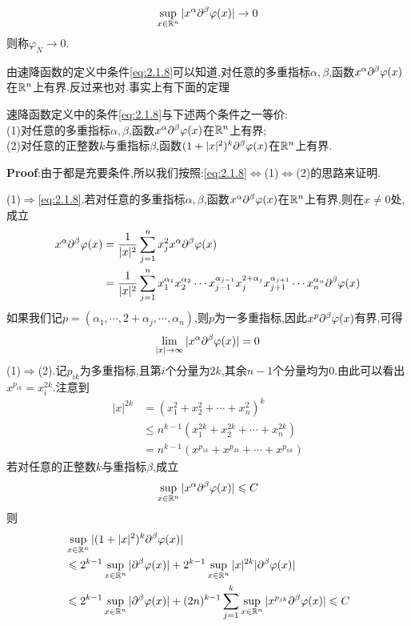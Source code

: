 $$
\sup_{x\in\mathbb{R} ^n}|x^{\alpha}\partial^{\beta}\varphi (x)|\to 0
$$
则称$\varphi_N\to 0$.\par
由速降函数的定义中条件\eqref{eq:2.1.8}可以知道,对任意的多重指标$\alpha,\beta$,函数$x^{\alpha}\partial^{\beta}\varphi (x)$在$\mathbb{R}^n$上有界.反过来也对.事实上有下面的定理
\begin{tcolorbox}[colback=KuangNei,colframe=BianKuang,title=\textbf{速降函数极限条件的等价定义},sharpish corners]
   速降函数定义中的条件\eqref{eq:2.1.8}与下述两个条件之一等价:\\
   (1)对任意的多重指标$\alpha,\beta$,函数$x^{\alpha}\partial^{\beta}\varphi (x)$在$\mathbb{R}^n$上有界;\\
   (2)对任意的正整数$k$与重指标$\beta$,函数$(1+|x|^2)^k\partial^{\beta}\varphi (x)$在$\mathbb{R}^n$上有界.
\end{tcolorbox}
\textbf{Proof}:由于都是充要条件,所以我们按照:\eqref{eq:2.1.8}$\Leftrightarrow $(1)$\Leftrightarrow $(2)的思路来证明.\par
(1)$\Rightarrow $\eqref{eq:2.1.8}.\quad 若对任意的多重指标$\alpha,\beta$,函数$x^{\alpha}\partial^{\beta}\varphi (x)$在$\mathbb{R}^n$上有界,则在$x\neq 0$处,成立
$$
\begin{aligned}
    x^{\alpha}\partial^{\beta}\varphi (x) &=\frac{1}{|x|^2}\sum_{j=1}^{n}x^2_jx^{\alpha}\partial^{\beta}\varphi (x)\\
                                     &=\frac{1}{|x|^2}\sum_{j=1}^{n}x_1^{\alpha_1}x_2^{\alpha_2}\cdots x_{j-1}^{\alpha_{j-1}}x^{2+\alpha_j}_j x_{j+1}^{\alpha_{j+1}}\cdots x^{\alpha_n}_n\partial^{\beta}\varphi (x)\\
\end{aligned}
$$
如果我们记$p=(\alpha_1,\cdots,2+\alpha_j,\cdots,\alpha_n)$,则$p$为一多重指标,因此$x^{p}\partial^{\beta}\varphi (x)$有界,可得
$$
\lim_{|x|\to \infty}|x^{\alpha}\partial^{\beta}\varphi (x)|=0
$$
\qquad (1)$\Rightarrow $(2).\quad 记$p_{ik}$为多重指标,且第$i$个分量为$2k$,其余$n-1$个分量均为0.由此可以看出$x^{p_{ik}}=x_i^{2k}$.注意到
$$
\begin{aligned}
    |x|^{2k} &= (x_1^2+x_2^2+\cdots+x_n^2)^k\\
             &\leqslant n^{k-1}(x_1^{2k}+x_2^{2k}+\cdots+x_n^{2k})\\
             &= n^{k-1}(x^{p_{1k}}+x^{p_{2k}}+\cdots+x^{p_{nk}})
\end{aligned}
$$
若对任意的正整数$k$与重指标$\beta$,成立
$$
\sup_{x\in\mathbb{R}^n}|x^{\alpha}\partial^{\beta}\varphi (x)|\leqslant C
$$
则
$$
\begin{aligned}
    &\sup_{x\in\mathbb{R}^n}|(1+|x|^2)^k\partial^{\beta}\varphi (x)|\\
    &\leqslant 2^{k-1}\sup_{x\in\mathbb{R}^n}|\partial^{\beta}\varphi (x)|+ 2^{k-1}\sup_{x\in\mathbb{R}^n}|x|^{2k}|\partial^{\beta}\varphi (x)|\\
    &\leqslant 2^{k-1}\sup_{x\in\mathbb{R}^n}|\partial^{\beta}\varphi (x)|+ (2n)^{k-1}\sum_{j=1}^{k}\sup_{x\in\mathbb{R}^n}|x^{p_{jk}}\partial^{\beta}\varphi (x)|\leqslant C
\end{aligned}
$$
